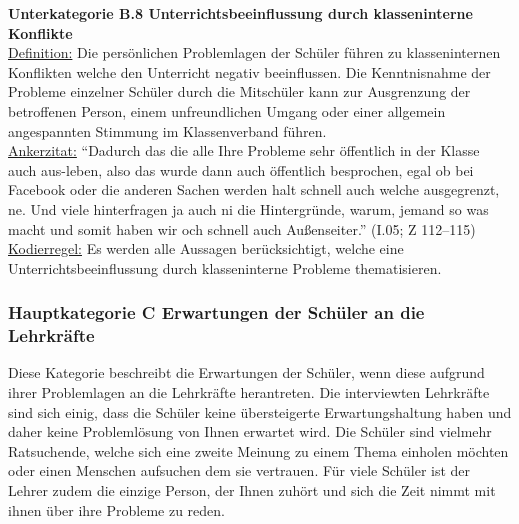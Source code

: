 \noindent
\textbf{Unterkategorie B.8 Unterrichtsbeeinflussung durch klasseninterne Konflikte}\\
\underline{Definition:} Die persönlichen Problemlagen der Schüler führen zu klasseninternen Konflikten welche den Unterricht negativ beeinflussen. Die Kenntnisnahme der Probleme einzelner Schüler durch die Mitschüler kann zur Ausgrenzung der betroffenen Person, einem unfreundlichen Umgang oder einer allgemein angespannten Stimmung im Klassenverband führen.\\
\underline{Ankerzitat:} "`Dadurch das die alle Ihre Probleme sehr öffentlich in der Klasse auch aus-leben, also das wurde dann auch öffentlich besprochen, egal ob bei Facebook oder die anderen Sachen werden halt schnell auch welche ausgegrenzt, ne. Und viele hinterfragen ja auch ni die Hintergründe, warum, jemand so was macht und somit haben wir och schnell auch Außenseiter."' (I.05; Z 112--115)\\
\underline{Kodierregel:} Es werden alle Aussagen berücksichtigt, welche eine Unterrichtsbeeinflussung durch klasseninterne Probleme thematisieren.

\subsubsection{Hauptkategorie C Erwartungen der Schüler an die Lehrkräfte}
\label{sec:HauptkategorieCErwartungenDerSchülerAnDieLehrkräfte}

Diese Kategorie beschreibt die Erwartungen der Schüler, wenn diese aufgrund ihrer Problemlagen an die Lehrkräfte herantreten. Die interviewten Lehrkräfte sind sich einig, dass die Schüler keine übersteigerte Erwartungshaltung haben und daher keine Problemlösung von Ihnen erwartet wird. Die Schüler sind vielmehr Ratsuchende, welche sich eine zweite Meinung zu einem Thema einholen möchten oder einen Menschen aufsuchen dem sie vertrauen. Für viele Schüler ist der Lehrer zudem die einzige Person, der Ihnen zuhört und sich die Zeit nimmt mit ihnen über ihre Probleme zu reden.\\

